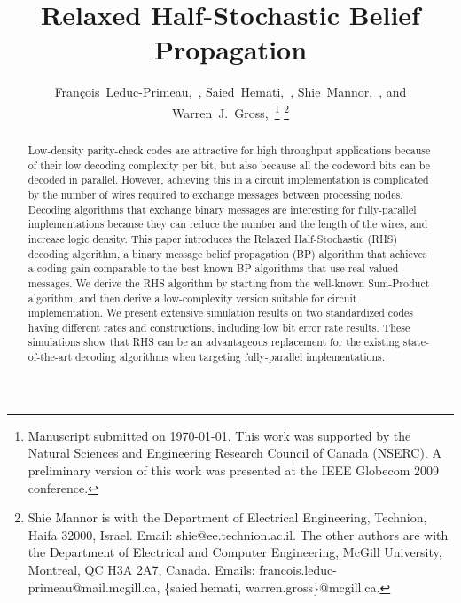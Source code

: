 \documentclass[12pt,journal,twoside,draftcls,onecolumn]{IEEEtran}
\begin{document}
\title{Relaxed Half-Stochastic Belief Propagation}


\author{Fran\c{c}ois~Leduc-Primeau,~, Saied~Hemati,~, Shie~Mannor,~, and Warren~J.~Gross,~\thanks{Manuscript submitted on \today. This work was supported by the Natural Sciences and Engineering Research Council of Canada (NSERC). A preliminary version of this work was presented at the IEEE Globecom 2009 conference.}
\thanks{Shie Mannor is with the Department of Electrical Engineering, Technion, Haifa 32000, Israel. Email: shie@ee.technion.ac.il. The other authors are with the Department of Electrical and Computer Engineering, McGill University, Montreal, QC H3A 2A7, Canada. Emails: francois.leduc-primeau@mail.mcgill.ca, \{saied.hemati, warren.gross\}@mcgill.ca.}
}





\maketitle
\thispagestyle{empty}



\begin{abstract}
Low-density parity-check codes are attractive for high throughput applications because of their low decoding complexity per bit, but also because all the codeword bits can be decoded in parallel. However, achieving this in a circuit implementation is complicated by the number of wires required to exchange messages between processing nodes.
Decoding algorithms that exchange binary messages are interesting for fully-parallel implementations because they can reduce the number and the length of the wires, and increase logic density.
This paper introduces the Relaxed Half-Stochastic (RHS) decoding algorithm, a binary message belief propagation (BP) algorithm that achieves a coding gain comparable to the best known BP algorithms that use real-valued messages.
We derive the RHS algorithm by starting from the well-known Sum-Product algorithm, and then derive a low-complexity version suitable for circuit implementation.
We present extensive simulation results on two standardized codes having different rates and constructions, including low bit error rate results. These simulations show that RHS can be an advantageous replacement for the existing state-of-the-art decoding algorithms when targeting fully-parallel implementations.
\end{abstract}
\end{document}
